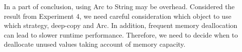 In a part of conclusion, using Arc to String may be overhead. Considered the result from Experiment 4, we need careful consideration which object to use which strategy, deep-copy and Arc.
In addition, frequent memory deallocation can lead to slower runtime performance. 
Therefore, we need to decide when to deallocate unused values taking account of memory capacity. 
